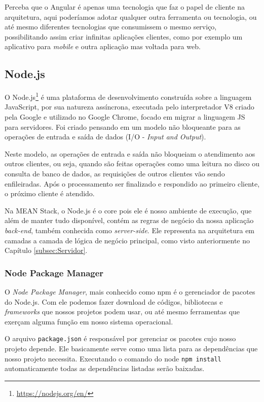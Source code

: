 \documentclass[
	12pt,				%
	openright,			%
	twoside,			%
	a4paper,			%
	english,			%
	brazil				%
	]{abntex2}
\begin{document}
Perceba que o Angular é apenas uma tecnologia que faz o papel de cliente na arquitetura, aqui poderíamos adotar qualquer outra ferramenta ou tecnologia, ou até mesmo diferentes tecnologias que consumissem o mesmo serviço, possibilitando assim criar infinitas aplicações clientes, como por exemplo um aplicativo para \textit{mobile} e outra aplicação mas voltada para web.

\subsection{Node.js}

O Node.js\footnote{\url{https://nodejs.org/en/}} é uma plataforma de desenvolvimento construída sobre a linguagem JavaScript, por sua natureza assíncrona, executada pelo interpretador V8 criado pela Google e utilizado no Google Chrome, focado em migrar a linguagem JS para servidores. Foi criado pensando em um modelo não bloqueante para as operações de entrada e saída de dados (I/O - \textit{Input and Output}).

Neste modelo, as operações de entrada e saída não bloqueiam o atendimento aos outros clientes, ou seja, quando são feitas operações como uma leitura no disco ou consulta de banco de dados, as requisições de outros clientes vão sendo enfileiradas. Após o processamento ser finalizado e respondido ao primeiro cliente, o próximo cliente é atendido.

Na MEAN Stack, o Node.js é o core pois ele é nosso ambiente de execução, que além de manter tudo disponível, contém as regras de negócio da nossa aplicação \textit{back-end}, também conhecida como \textit{server-side}. Ele representa na arquitetura em camadas a camada de lógica de negócio principal, como visto anteriormente no Capítulo \ref{subsec:Servidor}.

\subsubsection{Node Package Manager}

O \textit{Node Package Manager}, mais conhecido como npm é o gerenciador de pacotes do Node.js. Com ele podemos fazer download de códigos, bibliotecas e \textit{frameworks} que nossos projetos podem usar, ou até mesmo ferramentas que exerçam alguma função em nosso sistema operacional.

O arquivo \verb|package.json| é responsável por gerenciar os pacotes cujo nosso projeto depende. Ele basicamente serve como uma lista para as dependências que nosso projeto necessita. Executando o comando do node \verb|npm install| automaticamente todas as dependências listadas serão baixadas.
\end{document}
